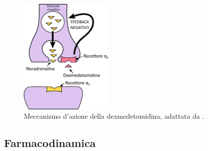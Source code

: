 \begin{figure} [t]
    \centering
    \includegraphics[width=0.4\textwidth]{Figure/dexfigpdf.pdf}
    \caption{Meccanismo d'azione della dexmedetomidina, adattata da \cite{Gertler2001}.}
    \label{fig:DEX}
\end{figure}

\subsection*{Farmacodinamica}

